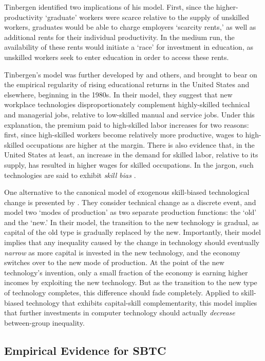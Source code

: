 Tinbergen identified two implications of his model. First, since the higher-productivity `graduate' workers were scarce relative to the supply of unskilled workers, graduates would be able to charge employers `scarcity rents,' as well as additional rents for their individual productivity. In the medium run, the availability of these rents would initiate a `race' for investment in education, as unskilled workers seek to enter education in order to access these rents.

Tinbergen's model was further developed by \citet{Katz1992} and others, and brought to bear on the empirical regularity of rising educational returns in the United States and elsewhere, beginning in the 1980s. In their model, they suggest that new workplace technologies disproportionately complement highly-skilled technical and managerial jobs, relative to low-skilled manual and service jobs. Under this explanation, the premium paid to high-skilled labor increases for two reasons: first, since high-skilled workers become relatively more productive, wages to high-skilled occupations are higher at the margin. There is also evidence that, in the United States at least, an increase in the demand for skilled labor, relative to its supply, has resulted in higher wages for skilled occupations. In the jargon, such technologies are said to exhibit \emph{skill bias} \citep{Autor2006}. 

One alternative to the canonical model of exogenous skill-biased technological change is presented by \citet{Beaudry2005}. They consider technical change as a discrete event, and model two `modes of production' as two separate production functions: the `old' and the `new.' In their model, the transition to the new technology is gradual, as capital of the old type is gradually replaced by the new. Importantly, their model implies that any inequality caused by the change in technology should eventually {\em narrow} as more capital is invested in the new technology, and the economy switches over to the new mode of production. At the point of the new technology's invention, only a small fraction of the economy is earning higher incomes by exploiting the new technology. But as the transition to the new type of technology completes, this difference should fade completely. Applied to skill-biased technology that exhibits capital-skill complementarity, this model implies that further investments in computer technology should actually {\em decrease} between-group inequality.

\subsection{Empirical Evidence for SBTC}

